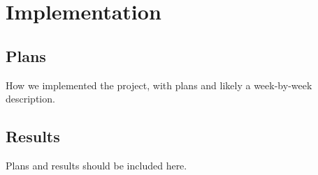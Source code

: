 \chapter{Implementation}
\section{Plans}
How we implemented the project, with plans and likely a week-by-week description.
\section{Results}
 Plans and results should be included here. 